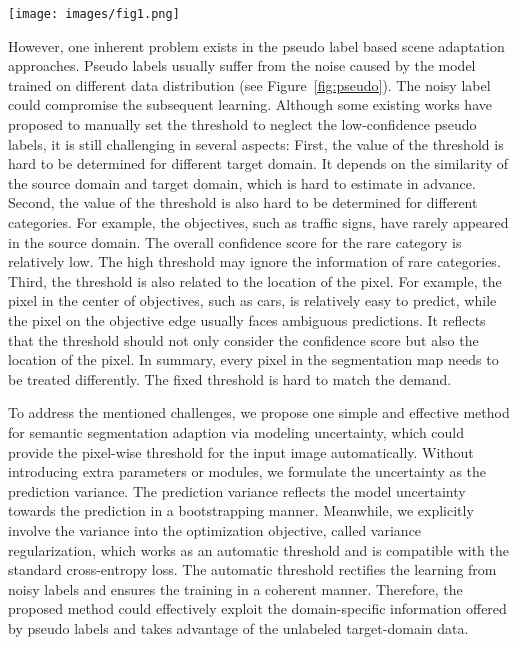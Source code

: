 \begin{figure*}[t]
\begin{center}
     \texttt{[image: images/fig1.png]}
\end{center} 
      \caption{ Samples of the noisy pseudo labels on Cityscapes~\protect\cite{cordts2016cityscapes}. We leverage the widely-used baseline model~\protect\cite{tsai2018learning} to generate pseudo labels. Despite the large area of correct prediction, the pseudo labels still suffer from the data distribution biases, and inevitably contains incorrect predictions. (Best viewed in \emph{color})}
      \label{fig:pseudo}
\end{figure*}

However, one inherent problem exists in the pseudo label based scene adaptation approaches. Pseudo labels usually suffer from the noise caused by the model trained on different data distribution (see Figure~\ref{fig:pseudo}). The noisy label could compromise the subsequent learning. Although some existing works \cite{zou2018unsupervised,zou2019confidence} have proposed to manually set the threshold to neglect the low-confidence pseudo labels, it is still challenging in several aspects: 
First, the value of the threshold is hard to be determined for different target domain. It depends on the similarity of the source domain and target domain, which is hard to estimate in advance. 
Second, the value of the threshold is also hard to be determined for different categories. For example, the objectives, such as traffic signs, have rarely appeared in the source domain. The overall confidence score for the rare category is relatively low. The high threshold may ignore the information of rare categories.
Third, the threshold is also related to the location of the pixel. For example, the pixel in the center of objectives, such as cars, is relatively easy to predict, while the pixel on the objective edge usually faces ambiguous predictions. It reflects that the threshold should not only consider the confidence score but also the location of the pixel. In summary, every pixel in the segmentation map needs to be treated differently. The fixed threshold is hard to match the demand.

To address the mentioned challenges, we propose one simple and effective method for semantic segmentation adaption via modeling uncertainty, which could provide the pixel-wise threshold for the input image automatically.
Without introducing extra parameters or modules,  we formulate the uncertainty as the prediction variance. The prediction variance reflects the model uncertainty towards the prediction in a bootstrapping manner. 
Meanwhile, we explicitly involve the variance into the optimization objective, called variance regularization, which works as an automatic threshold and is compatible with the standard cross-entropy loss. 
The automatic threshold rectifies the learning from noisy labels and ensures the training in a coherent manner. Therefore, the proposed method could effectively exploit the domain-specific information offered by pseudo labels and takes advantage of the unlabeled target-domain data.

